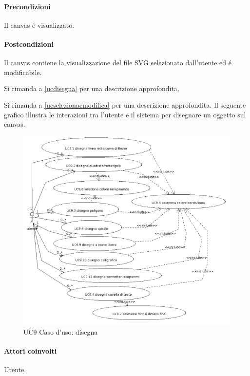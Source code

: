 \paragraph{Precondizioni} Il canvas \'e visualizzato.
\paragraph{Postcondizioni} Il canvas contiene la visualizzazione del file SVG selezionato dall'utente ed \'e modificabile.

Si rimanda a \ref{ucdisegna} per una descrizione approfondita.

Si rimanda a \ref{ucselezionaemodifica} per una descrizione approfondita.
\newpage
{}
\label{ucdisegna}
Il seguente grafico illustra le interazioni tra l'utente e il sistema per disegnare un oggetto sul canvas.

\begin{figure}[!ht]
\centering
\vspace{20pt} 
\includegraphics{UC9Espanso}
\caption{UC9 Caso d'uso: disegna}
\label{uc9}
\end{figure}


\paragraph{Attori coinvolti} Utente.
